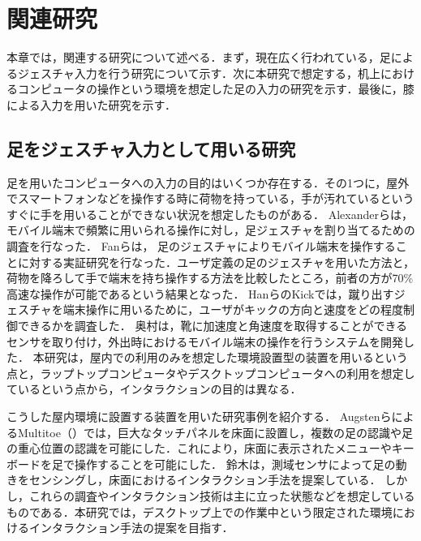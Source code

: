 \chapter{関連研究}
本章では，関連する研究について述べる．まず，現在広く行われている，足によるジェスチャ入力を行う研究について示す．次に本研究で想定する，机上におけるコンピュータの操作という環境を想定した足の入力の研究を示す．最後に，膝による入力を用いた研究を示す．

\section{足をジェスチャ入力として用いる研究}
足を用いたコンピュータへの入力の目的はいくつか存在する．その1つに，屋外でスマートフォンなどを操作する時に荷物を持っている，手が汚れているというすぐに手を用いることができない状況を想定したものがある．
Alexanderら\cite{Alexander:2012:PYB:2207676.2208575}は，モバイル端末で頻繁に用いられる操作に対し，足ジェスチャを割り当てるための調査を行なった．	
Fanら\cite{Fan:2017:ESF:3123021.3123043}は，
足のジェスチャによりモバイル端末を操作することに対する実証研究を行なった．ユーザ定義の足のジェスチャを用いた方法と，荷物を降ろして手で端末を持ち操作する方法を比較したところ，前者の方が70\%高速な操作が可能であるという結果となった．
HanらのKick\cite{Han:2011:KIU:2037373.2037379}では，蹴り出すジェスチャを端末操作に用いるために，ユーザがキックの方向と速度をどの程度制御できるかを調査した．
奥村\cite{okumura_2011}は，靴に加速度と角速度を取得することができるセンサを取り付け，外出時におけるモバイル端末の操作を行うシステムを開発した．
本研究は，屋内での利用のみを想定した環境設置型の装置を用いるという点と，ラップトップコンピュータやデスクトップコンピュータへの利用を想定しているという点から，インタラクションの目的は異なる．

こうした屋内環境に設置する装置を用いた研究事例を紹介する．
AugstenらによるMultitoe\cite{Augsten:2010:MHI:1866029.1866064}（）では，巨大なタッチパネルを床面に設置し，複数の足の認識や足の重心位置の認識を可能にした．これにより，床面に表示されたメニューやキーボードを足で操作することを可能にした．
鈴木\cite{ssuzuki_2009}は，測域センサによって足の動きをセンシングし，床面におけるインタラクション手法を提案している．
しかし，これらの調査やインタラクション技術は主に立った状態などを想定しているものである．本研究では，デスクトップ上での作業中という限定された環境におけるインタラクション手法の提案を目指す．

